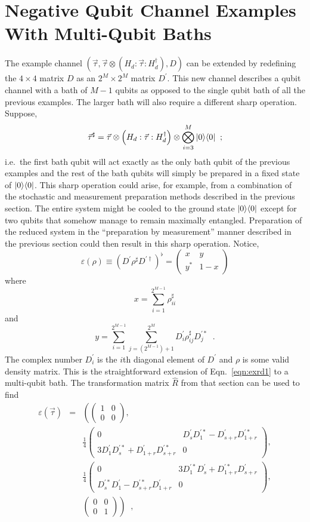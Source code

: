\section{Negative Qubit Channel Examples With Multi-Qubit Baths}
\label{sec:multibath}

The example channel $(\vec{\tau},\vec{\tau}\otimes \left( H_d:\vec{\tau}:H_d^\dagger\right),D)$ can be extended by redefining the $4\times4$ matrix $D$ as an $2^M\times 2^M$ matrix $D^\prime$.  This new channel describes a qubit channel with a bath of $M-1$ qubits as opposed to the single qubit bath of all the previous examples.  The larger bath will also require a different sharp operation.  Suppose,
$$
\vec{\tau}^\sharp = \vec{\tau}\otimes\left(H_d:\vec{\tau}:H_d^\dagger\right)\otimes\bigotimes_{i=3}^{M}|0\rangle\langle0|\;\;;
$$
i.e.\ the first bath qubit will act exactly as the only bath qubit of the previous examples and the rest of the bath qubits will simply be prepared in a fixed state of $|0\rangle\langle0|$.  This sharp operation could arise, for example, from a combination of the stochastic and measurement preparation methods described in the previous section.  The entire system might be cooled to the ground state $|0\rangle\langle0|$ except for two qubits that somehow manage to remain maximally entangled.  Preparation of the reduced system in the ``preparation by measurement'' manner described in the previous section could then result in this sharp operation.  Notice,
$$
\varepsilon(\rho) \equiv \left(D^\prime \rho^\sharp D^{\prime\dagger}\right)^\flat = \begin{pmatrix}x&y\\y^*&1-x\end{pmatrix}
$$
where
$$
x = \sum_{i=1}^{2^{M-1}} \rho^\sharp_{ii}
$$
and
$$
y = \sum_{i=1}^{2^{M-1}} \sum_{j=(2^{M-1})+1}^{2^M} D^\prime_{i} \rho^\sharp_{ij} D^{\prime *}_j\;\;.
$$
The complex number $D^\prime_i$ is the $i$th diagonal element of $D^\prime$ and $\rho$ is some valid density matrix.  This is the straightforward extension of Eqn.\ \ref{eqn:exrd1} to a multi-qubit bath.  The transformation matrix $\hat{R}$ from that section can be used to find    
\begin{eqnarray*}
\varepsilon(\vec{\tau}) &=& \left(\begin{pmatrix}
1&0\\0&0
\end{pmatrix},\right.\\
& &\frac{1}{4}\begin{pmatrix}
0&D^\prime_s D^{\prime *}_1-D^\prime_{s+r}D^{\prime *}_{1+r}\\
3D^\prime_1 D^{\prime *}_s+D^\prime_{1+r}D^{\prime *}_{s+r}&0
\end{pmatrix},\\
& &\frac{1}{4}\begin{pmatrix}
0&3D^{\prime *}_1 D^{\prime}_s+D^{\prime *}_{1+r}D^{\prime}_{s+r} \\
D^{\prime *}_s D^{\prime}_1-D^{\prime *}_{s+r}D^{\prime}_{1+r}&0
\end{pmatrix},\\
& &\left.\begin{pmatrix}
0&0\\
0&1
\end{pmatrix}\right)\;\;,
\end{eqnarray*}

